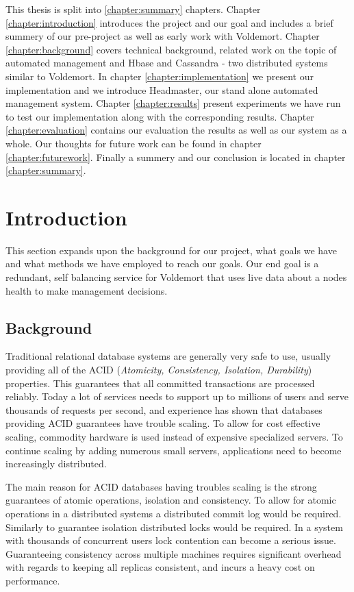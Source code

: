
This thesis is split into \ref{chapter:summary} chapters. Chapter \ref{chapter:introduction} introduces the project and our goal and includes a brief summery of our pre-project as well as early work with Voldemort. Chapter \ref{chapter:background} covers technical background, related work on the topic of automated management and Hbase and Cassandra - two distributed systems similar to Voldemort. In chapter \ref{chapter:implementation} we present our implementation and we introduce Headmaster, our stand alone automated management system. Chapter \ref{chapter:results} present experiments we have run to test our implementation along with the corresponding results. Chapter \ref{chapter:evaluation} contains our evaluation the results as well as our system as a whole. Our thoughts for future work can be found in chapter \ref{chapter:futurework}. Finally a summery and our conclusion is located in chapter \ref{chapter:summary}.

\section{Introduction}
This section expands upon the background for our project, what goals we have and what methods we have employed to reach our goals. 
Our end goal is a redundant, self balancing service for Voldemort that uses live data about a nodes health to make management decisions.

\subsection{Background}
Traditional relational database systems are generally very safe to use, usually providing all of the ACID (\emph{Atomicity, Consistency, Isolation, Durability}) properties.
This guarantees that all committed transactions are processed reliably. 
Today a lot of services needs to support up to millions of users and serve thousands of requests per second, and experience has shown that databases providing ACID guarantees have trouble scaling. 
To allow for cost effective scaling, commodity hardware is used instead of expensive specialized servers. To continue scaling by adding numerous small servers, applications need to become increasingly distributed.

The main reason for ACID databases having troubles scaling is the strong guarantees of atomic operations, isolation and consistency. 
To allow for atomic operations in a distributed systems a distributed commit log would be required. 
Similarly to guarantee isolation distributed locks would be required. In a system with thousands of concurrent users lock contention can become a serious issue. 
Guaranteeing consistency across multiple machines requires significant overhead with regards to keeping all replicas consistent, and incurs a heavy cost on performance. 

